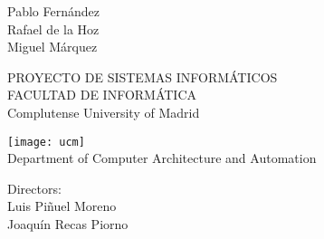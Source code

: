 \thispagestyle{empty}

\begin{center}
	{\Huge \textbf{\thetitle}}

	\vspace{1cm}
	{\large
		Pablo Fernández\\
		Rafael de la Hoz\\
		\vspace{1mm}
		Miguel Márquez
	}

	\vspace{1cm}
	PROYECTO DE SISTEMAS INFORMÁTICOS\\
	FACULTAD DE INFORMÁTICA\\
	Complutense University of Madrid
	\vspace{1cm}

	\texttt{[image: ucm]}\\
	\vspace{.5cm}
	Department of Computer Architecture and Automation\\
	\thedate
\end{center}

\begin{flushright}
	Directors:\\
	Luis Piñuel Moreno\\
	Joaquín Recas Piorno\\
\end{flushright}

